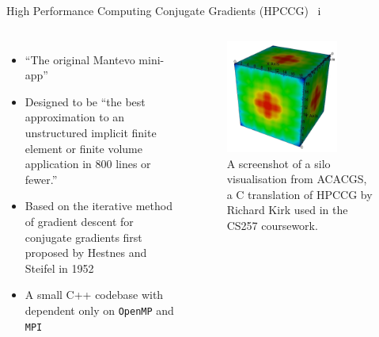 \documentclass[10pt,aspectratio=169]{beamer}
\begin{document}
\begin{frame}{High Performance Computing Conjugate Gradients (HPCCG) \ i}
    \begin{columns}[onlytextwidth]
            \begin{itemize}
                \item ``The original Mantevo mini-app'' \cite{MantevoHPCCG2023}
                \vspace{0.5cm}
                \item Designed to be ``the best approximation to an unstructured implicit finite element or finite volume application in 800 lines or fewer.'' \cite{heroux2013mantevo}
                \item Based on the iterative method of gradient descent for conjugate gradients first proposed by Hestnes and Steifel in 1952 \cite{hestenesMethodsConjugateGradients1952}
                \item A small C++ codebase with dependent only on \texttt{OpenMP} and \texttt{MPI}
            \end{itemize}
            \begin{figure}[H]
                \includegraphics[width=0.75\textwidth]{images/acacgs_silo_output.png}
                \captionsetup{width=.9\linewidth}
                \caption{A screenshot of a silo visualisation from ACACGS, a C translation of HPCCG by Richard Kirk used in the CS257 coursework.}
                \label{fig:warwick_mantevo_link}
            \end{figure}
    \end{columns}
\end{frame}
\end{document}
